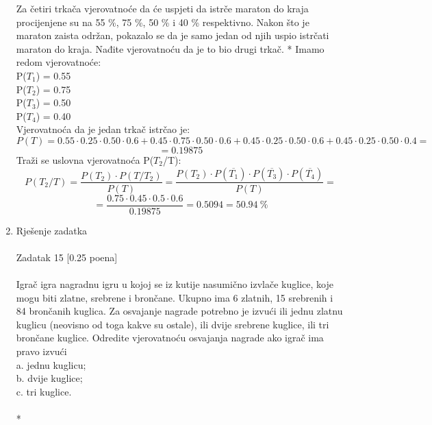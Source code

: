 \documentclass[12pt]{article}
\begin{document}
\begin{enumerate}
Za četiri trkača vjerovatnoće da će uspjeti da istrče maraton do kraja
procijenjene su na 55 \%, 75 \%, 50 \% i 40 \% respektivno. Nakon što je maraton
zaista održan, pokazalo se da je samo jedan od njih uspio istrčati maraton do
kraja. Nađite vjerovatnoću da je to bio drugi trkač.
		\newpage
		* Imamo redom vjerovatnoće: \\
		P($T_1$) = 0.55 \\
		P($T_2$) = 0.75 \\
		P($T_3$) = 0.50 \\
		P($T_4$) = 0.40 \\
		Vjerovatnoća da je jedan trkač istrčao je: \\
		\begin{equation*}
		    P(T) = 0.55 \cdot 0.25 \cdot 0.50 \cdot 0.6 + 0.45 \cdot 0.75 \cdot 0.50 \cdot 0.6 
		          + 0.45 \cdot 0.25 \cdot 0.50 \cdot 0.6 + 0.45 \cdot 0.25 \cdot 0.50 \cdot 0.4 =
		\end{equation*}
		\begin{equation*}
		        = 0.19875
		\end{equation*}
		Traži se uslovna vjerovatnoća P($T_2$/T):
		\begin{equation*}
		    P(T_2/T) = \frac{P(T_2) \cdot P(T/T_2)}{P(T)} = \frac{P(T_2) \cdot P(\overline{T_1}) 
		    \cdot  P(\overline{T_3})  \cdot P(\overline{T_4})}{P(T)} = 
		\end{equation*}
		\begin{equation*}
		        = \frac{0.75 \cdot 0.45 \cdot 0.5 \cdot 0.6}{0.19875} = 0.5094 = 50.94 ~\%
		\end{equation*}
		\item Rješenje zadatka \\
		\\
		Zadatak 15 [0.25 poena] \\
		\\
Igrač igra nagradnu igru u kojoj se iz kutije nasumično izvlače kuglice, koje
mogu biti zlatne, srebrene i brončane. Ukupno ima 6 zlatnih, 15 srebrenih i 84
brončanih kuglica. Za osvajanje nagrade potrebno je izvući ili jednu zlatnu
kuglicu (neovisno od toga kakve su ostale), ili dvije srebrene kuglice, ili tri
brončane kuglice. Odredite vjerovatnoću osvajanja nagrade ako igrač ima
pravo izvući \\
a. jednu kuglicu; \\
b. dvije kuglice; \\
c. tri kuglice. \\
\\
		* \\

\end{enumerate}
\end{document}
